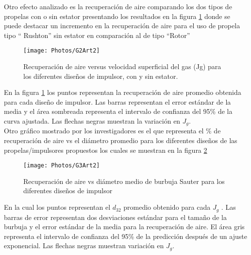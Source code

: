 \documentclass[11pt,letter
								]
								{article}
\begin{document}


Otro efecto analizado es  la recuperación de aire  comparando los dos tipos de propelas con o sin estator presentando los resultados en la figura \ref{G2Art2} donde se puede destacar un incremento en la recuperación de aire para el uso de propela tipo `` Rushton''  sin estator  en comparación al de tipo ``Rotor''\\ 

\begin{figure}[H]
\centering
\texttt{[image: Photos/G2Art2]}
\caption{Recuperación de aire versus velocidad superficial del gas (Jg) para los diferentes diseños de impulsor, con y sin estator. \cite{Art2}} 
\label{G2Art2}
\end{figure}

En la figura \ref{G2Art2} los puntos representan la recuperación de aire promedio obtenida para cada diseño de impulsor. Las barras  representan el error estándar de la media y el  área sombreada representa el intervalo de confianza del 95\% de la curva ajustada. Las flechas negras muestran la variación en $J_{g}$.\cite{Art2}\\


Otro gráfico mostrado por los investigadores es el que representa el \% de recuperación de  aire vs el diámetro promedio para los diferentes diseños de las propelas/impulsores propuestos los cuales se muestran en la figura \ref{G3Art2}




\begin{figure}[H]
\centering
\texttt{[image: Photos/G3Art2]}
\caption{Recuperación de aire vs diámetro medio de burbuja Sauter para los diferentes diseños de impulsor  \cite{Art2}} 
\label{G3Art2}
\end{figure}

En la cual los puntos representan el $d_{32} $ promedio obtenido para cada $ J_{g}$ . Las barras de error representan dos desviaciones estándar para el tamaño de la burbuja y el error estándar de la media para la recuperación de aire. El área gris representa el intervalo de confianza del 95\% de la predicción después de un ajuste exponencial. Las flechas negras muestran variación en $ J_{g}$.\\
\end{document}
